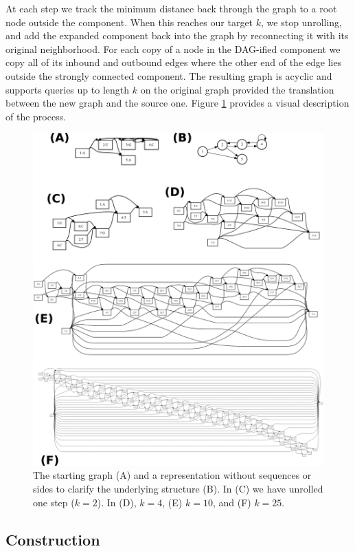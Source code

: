 \documentclass{article}
\begin{document}
At each step we track the minimum distance back through the graph to a root node outside the component.
When this reaches our target $k$, we stop unrolling, and add the expanded component back into the graph by reconnecting it with its original neighborhood.
For each copy of a node in the DAG-ified component we copy all of its inbound and outbound edges where the other end of the edge lies outside the strongly connected component.
The resulting graph is acyclic and supports queries up to length $k$ on the original graph provided the translation between the new graph and the source one.
Figure \ref{fig:kdagify} provides a visual description of the process.

\begin{figure}[t]
\centering
\includegraphics[width=1.0\textwidth]{figures/kdagify}
\caption{\label{fig:kdagify}
  The starting graph (A) and a representation without sequences or sides to clarify the underlying structure (B).
  In (C) we have unrolled one step ($k = 2$). In (D), $k = 4$, (E) $k = 10$, and (F) $k = 25$.
}
\end{figure}

\subsection{Construction}
\end{document}
